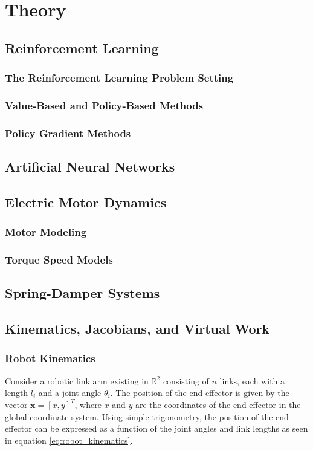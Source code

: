 \section{Theory}

\subsection{Reinforcement Learning}
    \subsubsection{The Reinforcement Learning Problem Setting}
    \subsubsection{Value-Based and Policy-Based Methods}
    \subsubsection{Policy Gradient Methods}

\subsection{Artificial Neural Networks}

\subsection{Electric Motor Dynamics}
    \subsubsection{Motor Modeling}
    \subsubsection{Torque Speed Models}

\subsection{Spring-Damper Systems}

\subsection{Kinematics, Jacobians, and Virtual Work}
    \subsubsection{Robot Kinematics}
    \label{sec:robot_kinematics}
Consider a robotic link arm existing in $\mathbb{R}^2$ consisting of $n$ links, each with a length $l_i$ and a joint angle $\theta_i$. The position of the end-effector is given by the vector $\mathbf{x} = [x, y]^T$, where $x$ and $y$ are the coordinates of the end-effector in the global coordinate system. Using simple trigonometry, the position of the end-effector can be expressed as a function of the joint angles and link lengths as seen in equation \ref{eq:robot_kinematics}.

